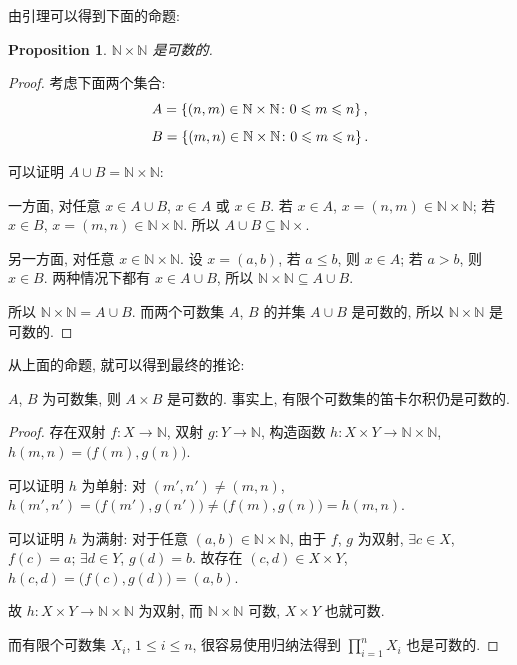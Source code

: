 \documentclass[UTF8]{ctexart}
\theoremstyle{mystyle}
\newtheorem{proposition}{Proposition}[section]
\theoremstyle{myremark}
\theoremstyle{plain}
\newcommand{\N}{\mathbb N}
\DeclarePairedDelimiter\set{\{}{\}}
\begin{document}
由引理可以得到下面的命题:

\begin{proposition}
    $ \N \times \N $ 是可数的.
\end{proposition}

\begin{proof}
    考虑下面两个集合:
    \[ A = \set{(n, m) \in \N \times \N \colon 0 \leqslant m \leqslant n} \,,\]
    \[ B = \set{(m, n) \in \N \times \N \colon 0 \leqslant m \leqslant n} \,.\]

    可以证明 $ A \cup B = \N \times \N $:

    一方面, 对任意 $ x \in A \cup B $, $ x \in A $ 或 $ x \in B $. 若 $ x \in A $, $ x = (n, m) \in \N \times \N $; 若 $ x \in B $, $ x = (m, n) \in \N \times \N $. 所以 $ A \cup B \subseteq \N \times $.

    另一方面, 对任意 $ x \in \N \times \N $. 设 $ x = (a, b) $, 若 $ a \leqslant b $, 则 $ x \in A $; 若 $ a > b $, 则 $ x \in B $. 两种情况下都有 $ x \in A \cup B $, 所以 $ \N \times \N \subseteq A \cup B $.

    所以 $ \N \times \N = A \cup B $. 而两个可数集 $ A $, $ B $ 的并集 $ A \cup B $ 是可数的, 所以 $ \N \times \N $ 是可数的.
\end{proof}

从上面的命题, 就可以得到最终的推论:

\begin{theorem}
    $ A $, $ B $ 为可数集, 则 $ A \times B $ 是可数的. 事实上, 有限个可数集的笛卡尔积仍是可数的.
\end{theorem}

\begin{proof}
    存在双射 $ f \colon X \to \N $, 双射 $ g \colon Y \to \N $, 构造函数 $ h \colon X \times Y \to \N \times \N $, $ h(m, n) = \big( f(m), g(n) \big) $. 
    
    可以证明 $ h $ 为单射: 对 $ (m', n') \neq (m, n) $, $ h(m', n') = \big( f(m'), g(n') \big) \neq \big( f(m), g(n) \big) = h(m, n) $.

    可以证明 $ h $ 为满射: 对于任意 $ (a, b) \in \N \times \N $, 由于 $ f $, $ g $ 为双射, $ \exists c \in X $, $ f(c) = a $; $ \exists d \in Y $, $ g(d) = b $. 故存在 $ (c, d) \in X \times Y $, $ h(c, d) = \big( f(c), g(d) \big) = (a, b) $.

    故 $ h \colon X \times Y \to \N \times \N $ 为双射, 而 $ \N \times \N $ 可数, $ X \times Y $ 也就可数.

    而有限个可数集 $ X_i $, $ 1 \leqslant i \leqslant n $, 很容易使用归纳法得到 $ \prod\limits_{i = 1}^n X_i $ 也是可数的.
\end{proof}
\end{document}
